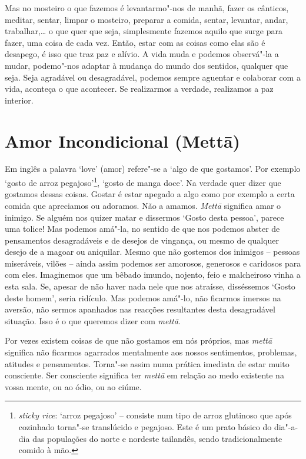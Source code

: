 Mas no mosteiro o que fazemos é levantarmo"-nos de manhã, fazer os
cânticos, meditar, sentar, limpar o mosteiro, preparar a
comida, sentar, levantar, andar, trabalhar,\ldots{} o que quer que
seja, simplesmente fazemos aquilo que surge para fazer, uma coisa de cada vez.
Então, estar com as coisas como elas são é desapego, é isso que traz paz
e alívio. A vida muda e podemos observá"-la a mudar, podemo"-nos adaptar à
mudança do mundo dos sentidos, qualquer que seja. Seja agradável ou
desagradável, podemos sempre aguentar e colaborar com a vida, aconteça o
que acontecer. Se realizarmos a verdade, realizamos a paz interior.

\chapter{Amor Incondicional (Mettā)}

Em inglês a palavra `love' (amor) refere"-se a `algo de que gostamos'.
Por exemplo `gosto de arroz pegajoso'\footnote{%
  \emph{sticky rice}: `arroz pegajoso' -- consiste num tipo de arroz
  glutinoso que após cozinhado torna"-se translúcido e pegajoso. Este é um
  prato básico do dia"-a-dia das populações do norte e nordeste tailandês,
  sendo tradicionalmente comido à mão.},
`gosto de manga doce'. Na
verdade quer dizer que gostamos dessas coisas. Gostar é estar apegado a
algo como por exemplo a certa comida que apreciamos ou adoramos. Não a
amamos. \emph{Mettā} significa amar o inimigo. Se alguém nos quizer
matar e dissermos `Gosto desta pessoa', parece uma tolice! Mas podemos
amá"-la, no sentido de que nos podemos abster de pensamentos
desagradáveis e de desejos de vingança, ou mesmo de qualquer desejo de a
magoar ou aniquilar. Mesmo que não gostemos dos inimigos -- pessoas
miseráveis, vilões -- ainda assim podemos ser amorosos, generosos e
caridosos para com eles. Imaginemos que um bêbado imundo, nojento, feio
e malcheiroso vinha a esta sala. Se, apesar de não haver nada nele que
nos atraísse, disséssemos `Gosto deste homem', seria ridículo. Mas
podemos amá"-lo, não ficarmos imersos na aversão, não sermos apanhados
nas reacções resultantes desta desagradável situação. Isso é o que
queremos dizer com \emph{mettā}.

Por vezes existem coisas de que não gostamos em nós próprios, mas
\emph{mettā} significa não ficarmos agarrados mentalmente aos nossos
sentimentos, problemas, atitudes e pensamentos. Torna"-se assim numa
prática imediata de estar muito consciente. Ser consciente significa ter
\emph{mettā} em relação ao medo existente na vossa mente, ou ao ódio, ou
ao ciúme.


